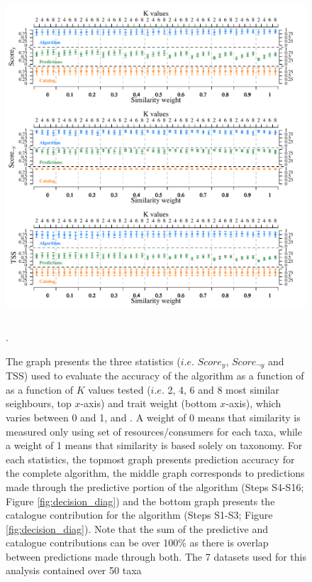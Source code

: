 \documentclass[letterpaper]{article}
\begin{document}
\newpage
    \begin{figure}[h]
      \centering\includegraphics[width=\textwidth, height=12cm]{multiple_parameters2.pdf}
      \caption{The graph presents the three statistics ($i.e.$ $Score_y$, $Score_{\neg y}$ and TSS) used to evaluate the accuracy of the algorithm as a function of as a function of $K$ values tested ($i.e.$ 2, 4, 6 and 8 most similar seighbours, top $x$-axis) and trait weight (bottom $x$-axis), which varies between 0 and 1, and . A weight of 0 means that similarity is measured only using set of resources/consumers for each taxa, while a weight of 1 means that similarity is based solely on taxonomy. For each statistics, the topmost graph presents prediction accuracy for the complete algorithm, the middle graph corresponds to predictions made through the predictive portion of the algorithm (Steps S4-S16; Figure \ref{fig:decision_diag}) and the bottom graph presents the catalogue contribution for the algorithm (Steps S1-S3; Figure \ref{fig:decision_diag}). Note that the sum of the predictive and catalogue contributions can be over 100\% as there is overlap between predictions made through both. The 7 datasets used for this analysis contained over 50 taxa \citep{Christian1999, Link2002, Brose2005, Thompson2005, Barnes2008, Kortsch2015}}.
      \label{fig:multi_param}
    \end{figure}
\end{document}
